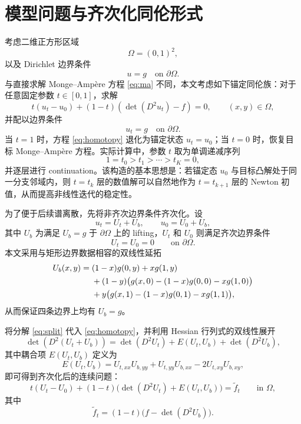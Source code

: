 \documentclass[11pt,a4paper]{article}
\begin{document}
\section{模型问题与齐次化同伦形式}
考虑二维正方形区域
\[
\Omega=(0,1)^2,
\]
以及 Dirichlet 边界条件
\begin{equation}
u=g \quad \text{on }\partial\Omega.
\label{eq:bc}
\end{equation}
与直接求解 Monge--Amp\`ere 方程 \eqref{eq:ma} 不同，本文考虑如下锚定同伦族：对于任意固定参数 $t\in[0,1]$，求解
\begin{equation}
t(u_t-u_0)+(1-t)(\det(D^2u_t)-f)=0,
\qquad (x,y)\in\Omega,
\label{eq:homotopy}
\end{equation}
并配以边界条件
\begin{equation}
u_t=g \quad \text{on }\partial\Omega.
\label{eq:bc-t}
\end{equation}
当 $t=1$ 时，方程 \eqref{eq:homotopy} 退化为锚定状态 $u_t=u_0$；当 $t=0$ 时，恢复目标 Monge--Amp\`ere 方程。实际计算中，参数 $t$ 取为单调递减序列
\begin{equation}
1=t_0>t_1>\cdots>t_K=0,
\label{eq:t-sequence}
\end{equation}
并逐层进行 continuation。该构造的基本思想是：若锚定态 $u_0$ 与目标凸解处于同一分支邻域内，则 $t=t_k$ 层的数值解可以自然地作为 $t=t_{k+1}$ 层的 Newton 初值，从而提高非线性迭代的稳定性。

为了便于后续谱离散，先将非齐次边界条件齐次化。设
\begin{equation}
u_t=U_t+U_b,
\qquad
u_0=U_0+U_b,
\label{eq:split}
\end{equation}
其中 $U_b$ 为满足 $U_b=g$ 于 $\partial\Omega$ 上的 lifting，$U_t$ 和 $U_0$ 则满足齐次边界条件
\[
U_t=U_0=0 \qquad \text{on }\partial\Omega.
\]
本文采用与矩形边界数据相容的双线性延拓
\begin{align}
U_b(x,y)
= {} & (1-x)g(0,y)+xg(1,y) \notag \\
& +(1-y)\bigl(g(x,0)-(1-x)g(0,0)-xg(1,0)\bigr) \notag \\
& +y\bigl(g(x,1)-(1-x)g(0,1)-xg(1,1)\bigr),
\label{eq:ub}
\end{align}
从而保证四条边界上均有 $U_b=g$。

将分解 \eqref{eq:split} 代入 \eqref{eq:homotopy}，并利用 Hessian 行列式的双线性展开
\begin{equation}
\det(D^2(U_t+U_b))
=
\det(D^2U_t)+E(U_t,U_b)+\det(D^2U_b),
\label{eq:det-expand}
\end{equation}
其中耦合项 $E(U_t,U_b)$ 定义为
\begin{equation}
E(U_t,U_b)
=
U_{t,xx}U_{b,yy}+U_{t,yy}U_{b,xx}-2U_{t,xy}U_{b,xy},
\label{eq:E-phys}
\end{equation}
即可得到齐次化后的连续问题：
\begin{equation}
t(U_t-U_0)+(1-t)\bigl(\det(D^2U_t)+E(U_t,U_b)\bigr)=\widetilde f_t
\qquad \text{in }\Omega,
\label{eq:homotopy-hom}
\end{equation}
其中
\begin{equation}
\widetilde f_t=(1-t)\bigl(f-\det(D^2U_b)\bigr).
\label{eq:f-tilde}
\end{equation}
\end{document}
